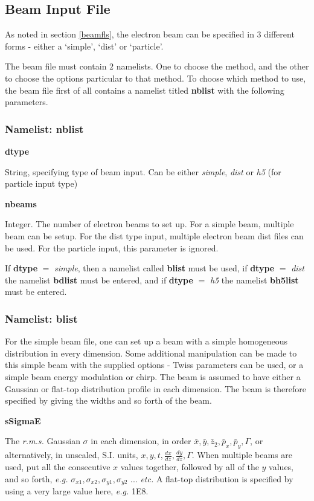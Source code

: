 \documentclass[12pt]{article}%
\begin{document}
\newpage

\subsection{Beam Input File}

As noted in section \ref{beamfls}, the electron beam can be specified in 3 different forms - either a `simple', `dist' or `particle'.

The beam file must contain $2$ namelists. One to choose the method, and the other to choose the options particular to that method. To choose which method to use, the beam file first of all contains a namelist titled {\bf nblist} with the following parameters.

\subsubsection{Namelist: nblist}

{\bf dtype}

String, specifying type of beam input. Can be either {\it simple}, {\it dist} or {\it h5} (for particle input type)

{\bf nbeams}

Integer. The number of electron beams to set up. For a simple beam, multiple beam can be setup. For the dist type input, multiple electron beam dist files can be used. For the particle input, this parameter is ignored.

If {\bf dtype} $=$ {\it simple}, then a namelist called {\bf blist} must be used, if {\bf dtype} $=$ {\it dist} the namelist {\bf bdlist} must be entered, and if {\bf dtype} $=$ {\it h5} the namelist {\bf bh5list} must be entered.

\subsubsection{Namelist: blist}

For the simple beam file, one can set up a beam with a simple homogeneous distribution in every dimension. Some additional manipulation can be made to this simple beam with the supplied options - Twiss parameters can be used, or a simple beam energy modulation or chirp. The beam is assumed to have either a Gaussian or flat-top distribution profile in each dimension. The beam is therefore specified by giving the widths and so forth of the beam.

{\bf sSigmaE}

The \textit{r.m.s.} Gaussian $\sigma$ in each dimension, in order $\bar{x}, \bar{y}, \bar{z}_2, \bar{p}_x, \bar{p}_y, \Gamma$, or alternatively, in unscaled, S.I. units, $x,y,t,\frac{dx}{dz}, \frac{dy}{dz}, \Gamma$. When multiple beams are used, put all the consecutive $x$ values together, followed by all of the $y$ values, and so forth, \textit{e.g.} $\sigma_{x1}, \sigma_{x2}, \sigma_{y1}, \sigma_{y2}$ ... \textit{etc.} A flat-top distribution is specified by using a very large value here, \textit{e.g.} 1E8.
\end{document}
